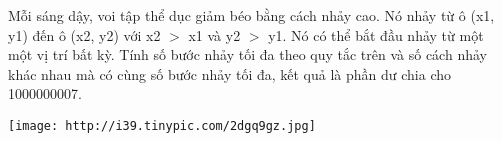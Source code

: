 Mỗi sáng dậy, voi tập thể dục giảm béo bằng cách nhảy cao. Nó nhảy từ ô (x1, y1) đến ô (x2, y2) với x2 $>$ x1 và y2 $>$ y1. Nó có thể bắt đầu nhảy từ một một vị trí bất kỳ. Tính số bước nhảy tối đa theo quy tắc trên và số cách nhảy khác nhau mà có cùng số bước nhảy tối đa, kết quả là phần dư chia cho 1000000007.  

\href{http://tinypic.com}{}


\texttt{[image: http://i39.tinypic.com/2dgq9gz.jpg]}